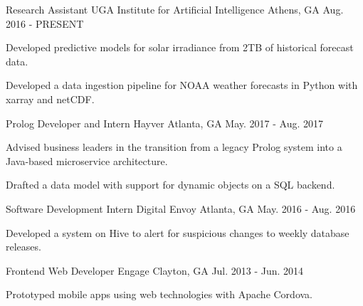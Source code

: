 \begin{cventries}

\cventry
{Research Assistant}
{UGA Institute for Artificial Intelligence}
{Athens, GA}
{Aug. 2016 - PRESENT}
{\begin{cvitems}
    \item {Developed predictive models for solar irradiance from 2TB of historical forecast data.}
    \item {Developed a data ingestion pipeline for NOAA weather forecasts in Python with xarray and netCDF.}
\end{cvitems}}

\cventry
{Prolog Developer and Intern}
{Hayver}
{Atlanta, GA}
{May. 2017 - Aug. 2017}
{\begin{cvitems}
    \item {Advised business leaders in the transition from a legacy Prolog system into a Java-based microservice architecture.}
    \item {Drafted a data model with support for dynamic objects on a SQL backend.}
\end{cvitems}}

\cventry
{Software Development Intern}
{Digital Envoy}
{Atlanta, GA}
{May. 2016 - Aug. 2016}
{\begin{cvitems}
    \item {Developed a system on Hive to alert for suspicious changes to weekly database releases.}
\end{cvitems}}

\cventry
{Frontend Web Developer}
{Engage}
{Clayton, GA}
{Jul. 2013 - Jun. 2014}
{{\begin{cvitems}
    \item {Prototyped mobile apps using web technologies with Apache Cordova.}
\end{cvitems}}}

\end{cventries}

